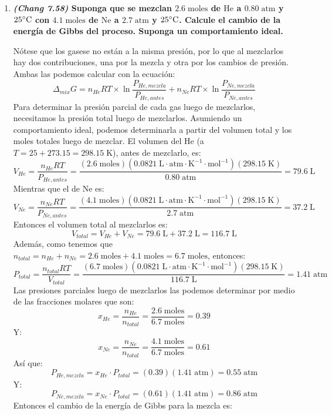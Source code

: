 \documentclass[a4paper,12pt]{article}
\begin{document}
\begin{enumerate}
\begin{enumerate}
  \item \textbf{?`Qu\'e puede deducir acerca de la naturaleza de las fuerzas intermoleculares entre el $\mbox{C}_6\mbox{H}_6$ y el $\mbox{CCl}_4$?}

Como se tiene m\'as volumen al mezclarlos que antes, las fuerzas intermoleculares entre el benceno y el tetracloruro de carbono son de repulsi\'on, es decir, necesitan m\'as volumen al mezclarlos porque se repelen (comparado con las fuerzas intermoleculares en las soluciones puras).

 \end{enumerate} %

 \item \textbf{\textit{(Chang 7.58)} Suponga que se mezclan $2.6\;\mbox{moles}$ de $\mbox{He}$ a $0.80\;\mbox{atm}$ y $25\celsius$ con $4.1\;\mbox{moles}$ de $\mbox{Ne}$ a $2.7\;\mbox{atm}$ y $25\celsius$. Calcule el cambio de la energ\'ia de Gibbs del proceso. Suponga un comportamiento ideal.} %

N\'otese que los gasese no est\'an a la misma presi\'on, por lo que al mezclarlos hay dos contribuciones, una por la mezcla y otra por los cambios de presi\'on. Ambas las podemos calcular con la ecuaci\'on:
$$\Delta_{mix}G=n_{He}RT\times\ln\frac{P_{He,mezcla}}{P_{He,antes}}+n_{Ne}RT\times\ln\frac{P_{Ne,mezcla}}{P_{Ne,antes}}$$
Para determinar la presi\'on parcial de cada gas luego de mezclarlos, necesitamos la presi\'on total luego de mezclarlos. Asumiendo un comportamiento ideal, podemos determinarla a partir del volumen total y los moles totales luego de mezclar. 
El volumen del $\mbox{He}$ (a $T=25+273.15=298.15\;\mbox{K}$), antes de mezclarlo, es:
$$V_{He}=\frac{n_{He}RT}{P_{He,antes}}=\frac{(2.6\;\mbox{moles})(0.0821\;\mbox{L}\cdot\mbox{atm}\cdot\mbox{K}^{-1}\cdot\mbox{mol}^{-1})(298.15\;\mbox{K})}{0.80\;\mbox{atm}}=79.6\;\mbox{L}$$
Mientras que el de $\mbox{Ne}$ es:
$$V_{Ne}=\frac{n_{Ne}RT}{P_{Ne,antes}}=\frac{(4.1\;\mbox{moles})(0.0821\;\mbox{L}\cdot\mbox{atm}\cdot\mbox{K}^{-1}\cdot\mbox{mol}^{-1})(298.15\;\mbox{K})}{2.7\;\mbox{atm}}=37.2\;\mbox{L}$$
Entonces el volumen total al mezclarlos es:
$$V_{total}=V_{He}+V_{Ne}=79.6\;\mbox{L}+37.2\;\mbox{L}=116.7\;\mbox{L}$$
Adem\'as, como tenemos que $n_{total}=n_{He}+n_{Ne}=2.6\;\mbox{moles}+4.1\;\mbox{moles}=6.7\;\mbox{moles}$, entonces:
$$P_{total}=\frac{n_{total}RT}{V_{total}}=\frac{(6.7\;\mbox{moles})(0.0821\;\mbox{L}\cdot\mbox{atm}\cdot\mbox{K}^{-1}\cdot\mbox{mol}^{-1})(298.15\;\mbox{K})}{116.7\;\mbox{L}}=1.41\;\mbox{atm}$$
Las presiones parciales luego de mezclarlos las podemos determinar por medio de las fracciones molares que son:
$$x_{He}=\frac{n_{He}}{n_{total}}=\frac{2.6\;\mbox{moles}}{6.7\;\mbox{moles}}=0.39$$
Y:
$$x_{Ne}=\frac{n_{Ne}}{n_{total}}=\frac{4.1\;\mbox{moles}}{6.7\;\mbox{moles}}=0.61$$
As\'i que:
$$P_{He,mezcla}=x_{He}\cdot P_{total}=(0.39)(1.41\;\mbox{atm})=0.55\;\mbox{atm}$$
Y:
$$P_{Ne,mezcla}=x_{Ne}\cdot P_{total}=(0.61)(1.41\;\mbox{atm})=0.86\;\mbox{atm}$$
Entonces el cambio de la energ\'ia de Gibbs para la mezcla es:


\end{enumerate}
\end{document}
